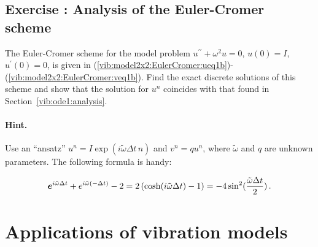 \documentclass[%
oneside,                 %
final,                   %
10pt]{article}
\newenvironment{doconceexercise}{}{}
\newcounter{doconceexercisecounter}
\begin{document}
\begin{doconceexercise}

\subsection*{Exercise \thedoconceexercisecounter: Analysis of the Euler-Cromer scheme}

\label{vib:exer:EulerCromer:analysis}

The Euler-Cromer scheme for the model problem
$u^{\prime\prime} + \omega^2 u =0$, $u(0)=I$, $u^{\prime}(0)=0$, is given in
(\ref{vib:model2x2:EulerCromer:ueq1b})-(\ref{vib:model2x2:EulerCromer:veq1b}).
Find the exact discrete solutions of this scheme and show that the solution
for $u^n$ coincides with that found in Section~\ref{vib:ode1:analysis}.


\paragraph{Hint.}
Use an ``ansatz'' $u^n=I\exp{(i\tilde\omega\Delta t\,n)}$ and
$v^n=qu^n$, where $\tilde\omega$ and $q$ are unknown parameters. The
following formula is handy:

\[ \e^{i\tilde\omega\Delta t} + e^{i\tilde\omega(-\Delta t)} - 2
= 2\left(\cosh(i\tilde\omega\Delta t) -1 \right)
=-4\sin^2(\frac{\tilde\omega\Delta t}{2})\tp\]






\end{doconceexercise}


\section{Applications of vibration models}
\label{vib:app}
\end{document}
